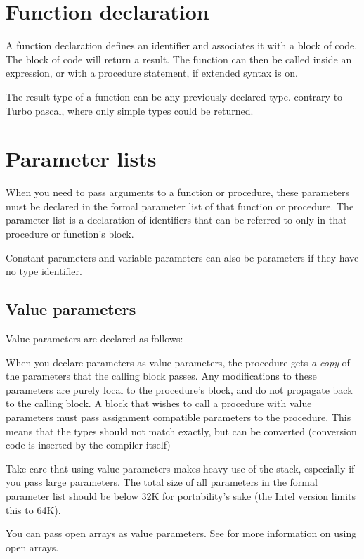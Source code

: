 \documentclass{report}
\begin{document}
\section{Function declaration}
A function declaration defines an identifier and associates it with a
block of code. The block of code will return a result.
The function can then be called inside an expression, or with a procedure
statement, if extended syntax is on.

The result type of a function can be any previously declared type.
contrary to Turbo pascal, where only simple types could be returned.

\section{Parameter lists}
\label{se:Parameters}
When you need to pass arguments to a function or procedure, these parameters
must be declared in the formal parameter list of that function or procedure.
The parameter list is a declaration of identifiers that can be referred to
only in that procedure or function's block.

Constant parameters and variable parameters can also be 
parameters if they have no type identifier.
\subsection{Value parameters}
Value parameters are declared as follows:

When you declare parameters as value parameters, the procedure gets {\em
a copy} of the parameters that the calling block passes. Any modifications
to these parameters are purely local to the procedure's block, and do not
propagate back to the calling block.
A block that wishes to call a procedure with value parameters must pass
assignment compatible parameters to the procedure. This means that the types
should not match exactly, but can be converted (conversion code is inserted
by the compiler itself)

Take care that using value parameters makes heavy use of the stack,
especially if you pass large parameters. The total size of all parameters in
the formal parameter list should be below 32K for portability's sake (the
Intel version limits this to 64K).

You can pass open arrays as value parameters. See  for
more information on using open arrays.
\end{document}

